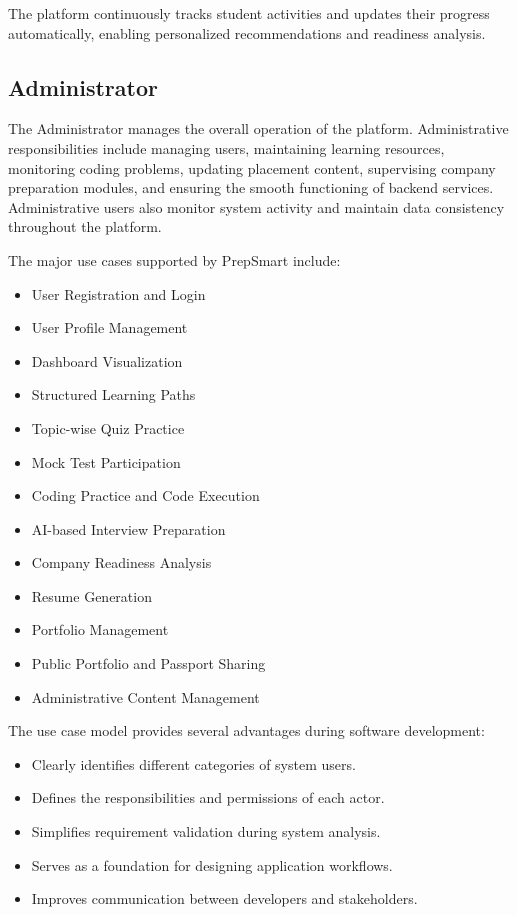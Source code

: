 The platform continuously tracks student activities and updates their progress automatically, enabling personalized recommendations and readiness analysis.

\subsection{Administrator}

The Administrator manages the overall operation of the platform. Administrative responsibilities include managing users, maintaining learning resources, monitoring coding problems, updating placement content, supervising company preparation modules, and ensuring the smooth functioning of backend services. Administrative users also monitor system activity and maintain data consistency throughout the platform.

The major use cases supported by PrepSmart include:

\begin{itemize}
    \item User Registration and Login
    \item User Profile Management
    \item Dashboard Visualization
    \item Structured Learning Paths
    \item Topic-wise Quiz Practice
    \item Mock Test Participation
    \item Coding Practice and Code Execution
    \item AI-based Interview Preparation
    \item Company Readiness Analysis
    \item Resume Generation
    \item Portfolio Management
    \item Public Portfolio and Passport Sharing
    \item Administrative Content Management
\end{itemize}

The use case model provides several advantages during software development:

\begin{itemize}
    \item Clearly identifies different categories of system users.
    \item Defines the responsibilities and permissions of each actor.
    \item Simplifies requirement validation during system analysis.
    \item Serves as a foundation for designing application workflows.
    \item Improves communication between developers and stakeholders.
\end{itemize}


